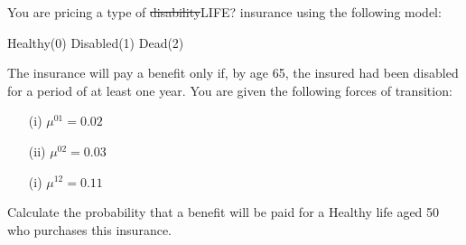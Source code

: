 You are pricing a type of \sout{disability}LIFE? insurance using the following model:
\begin{center} Healthy(0) \hspace{1in} Disabled(1) \hspace{1in}  Dead(2)   \end{center}
The insurance will pay a benefit only if, by age 65, the insured had been disabled for a period of at least one year. 
You are given the following forces of transition:
\begin{itemize}
\item[(i)] $\mu^{01} = 0.02$
\item[(ii)] $\mu^{02} = 0.03$
\item[(i)] $\mu^{12} = 0.11$
\end{itemize}
Calculate the probability that a benefit will be paid for a Healthy life aged 50 who purchases this insurance.
